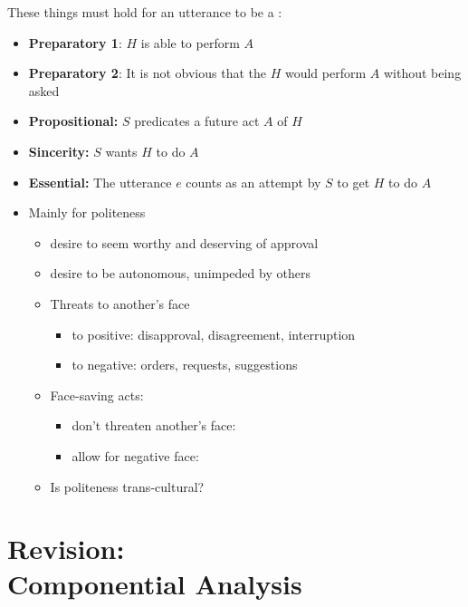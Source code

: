 \documentclass[headrule,footrule]{foils}
\begin{document}
These things must hold for an utterance to be a :
\begin{itemize}
\item \textbf{Preparatory 1}: $H$ is able to perform  $A$
\item \textbf{Preparatory 2}: It is not obvious that the $H$ would perform $A$  without being asked
\item \textbf{Propositional:} $S$ predicates a future act $A$ of $H$
\item \textbf{Sincerity:}  $S$ wants $H$ to do $A$ 
\item \textbf{Essential:} The utterance $e$ counts as an attempt by $S$ to get $H$ to do $A$
\end{itemize}


 

\begin{itemize}
\item Mainly for politeness
\begin{itemize}
\item {} desire to seem worthy and deserving of approval
\item {} desire to be autonomous, unimpeded by others
\item Threats to another’s face
  \begin{itemize}
  \item to positive: disapproval, disagreement, interruption
  \item to negative: orders, requests, suggestions
  \end{itemize}
\item Face-saving acts: 
  \begin{itemize}
  \item don't threaten another’s face: 
  \item allow for negative face: 
  \end{itemize}
\item Is politeness trans-cultural?
\end{itemize}
\end{itemize}

\section{Revision: \\ Componential Analysis}
\end{document}

